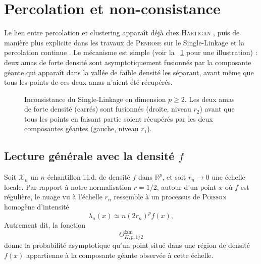 \section{Percolation et non-consistance}

Le lien entre percolation et clustering apparaît déjà chez \textsc{Hartigan} \cite{hartigan81}, puis de manière plus explicite dans les travaux de \textsc{Penrose} sur le Single-Linkage et la percolation continue \cite{Penrose1995, penrose2003}. Le mécanisme est simple (voir la \Fig~\ref{fig:percolation_2_carres} pour une illustration) : deux amas de forte densité sont asymptotiquement fusionnés par la composante géante qui apparaît dans la vallée de faible densité les séparant, avant même que tous les points de ces deux amas n'aient été récupérés.

\begin{figure}[!ht]
  \centering
  \caption{Inconsistance du Single-Linkage en dimension $p\ge2$. Les deux amas de forte densité (carrés) sont fusionnés (droite, niveau $r_2$) avant que tous les points en faisant partie soient récupérés par les deux composantes géantes (gauche, niveau $r_1$).\label{fig:percolation_2_carres}}
\end{figure}

\subsection{Lecture générale avec la densité $f$}

Soit $\mathcal X_n$ un $n$-échantillon i.i.d. de densité $f$ dans $\mathbb R^p$, et soit $r_n\to0$ une échelle locale. Par rapport à notre normalisation $r=1/2$, autour d'un point $x$ où $f$ est régulière, le nuage vu à l'échelle $r_n$ ressemble à un processus de \textsc{Poisson} homogène d'intensité
\[
    \lambda_n(x) \simeq n(2r_n)^p f(x),
\]
Autrement dit, la fonction
\[
    \Theta^{\mathrm{fam}}_{K,p,1/2}
\]
donne la probabilité asymptotique qu'un point situé dans une région de densité $f(x)$ appartienne à la composante géante observée à cette échelle.

